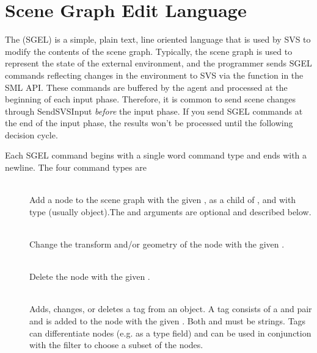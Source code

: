 \section{Scene Graph Edit Language}

The  (SGEL) is a simple, plain text, line oriented language that is used by SVS to modify the contents of the scene graph.
Typically, the scene graph is used to represent the state of the external environment, and the programmer sends SGEL commands reflecting changes in the environment to SVS via the  function in the SML API.
These commands are buffered by the agent and processed at the beginning of each input phase.
Therefore, it is common to send scene changes through SendSVSInput \emph{before} the input phase.
If you send SGEL commands at the end of the input phase,
the results won't be processed until the following decision cycle.

Each SGEL command begins with a single word command type and ends with a newline.
The four command types are

\vspace{-12pt}
\begin{description}
	\item[] \hfill \\
		Add a node to the scene graph with the given , as a child of , and with type  (usually object).The  and  arguments are optional and described below.

	\item[] \hfill \\
		Change the transform and/or geometry of the node with the given .

	\item[] \hfill \\
		Delete the node with the given .

	\item[] \hfill \\
	  Adds, changes, or deletes a tag from an object. A tag consists of a  and  pair and is added to the node with the given . Both  and  must be strings. Tags can differentiate nodes (e.g. as a type field) and can be used in conjunction with the  filter to choose a subset of the nodes.
\end{description}
\vspace{-6pt}

